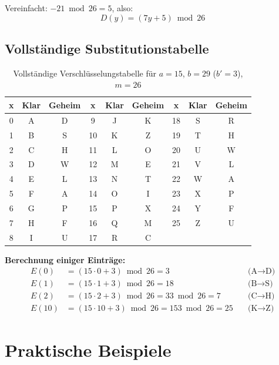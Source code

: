 ﻿\documentclass[12pt,a4paper]{article}
\begin{document}
	Vereinfacht: $-21 \bmod 26 = 5$, also:
	\begin{equation}
		\boxed{D(y) = (7y + 5) \bmod 26}
	\end{equation}
	
	\subsection{Vollständige Substitutionstabelle}
	
	\begin{table}[ht]
		\centering
		\caption{Vollständige Verschlüsselungstabelle für $a=15$, $b=29$ ($b'=3$), $m=26$}
		\begin{tabular}{|c|c|c||c|c|c||c|c|c|}
			\hline
			\textbf{x} & \textbf{Klar} & \textbf{Geheim} & \textbf{x} & \textbf{Klar} & \textbf{Geheim} & \textbf{x} & \textbf{Klar} & \textbf{Geheim} \\
			\hline
			0 & A & D & 9 & J & K & 18 & S & R \\
			1 & B & S & 10 & K & Z & 19 & T & H \\
			2 & C & H & 11 & L & O & 20 & U & W \\
			3 & D & W & 12 & M & E & 21 & V & L \\
			4 & E & L & 13 & N & T & 22 & W & A \\
			5 & F & A & 14 & O & I & 23 & X & P \\
			6 & G & P & 15 & P & X & 24 & Y & F \\
			7 & H & F & 16 & Q & M & 25 & Z & U \\
			8 & I & U & 17 & R & C & & & \\
			\hline
		\end{tabular}
	\end{table}
	
	\textbf{Berechnung einiger Einträge:}
	\begin{align}
		E(0) &= (15 \cdot 0 + 3) \bmod 26 = 3 \quad &\text{(A} \to \text{D)} \\
		E(1) &= (15 \cdot 1 + 3) \bmod 26 = 18 \quad &\text{(B} \to \text{S)} \\
		E(2) &= (15 \cdot 2 + 3) \bmod 26 = 33 \bmod 26 = 7 \quad &\text{(C} \to \text{H)} \\
		E(10) &= (15 \cdot 10 + 3) \bmod 26 = 153 \bmod 26 = 25 \quad &\text{(K} \to \text{Z)}
	\end{align}
	
	\section{Praktische Beispiele}
	
\end{document}
